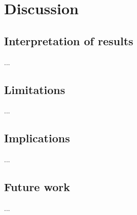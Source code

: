 \chapter{Discussion}

\section{Interpretation of results}
...

\section{Limitations}
...

\section{Implications}
...

\section{Future work}
...